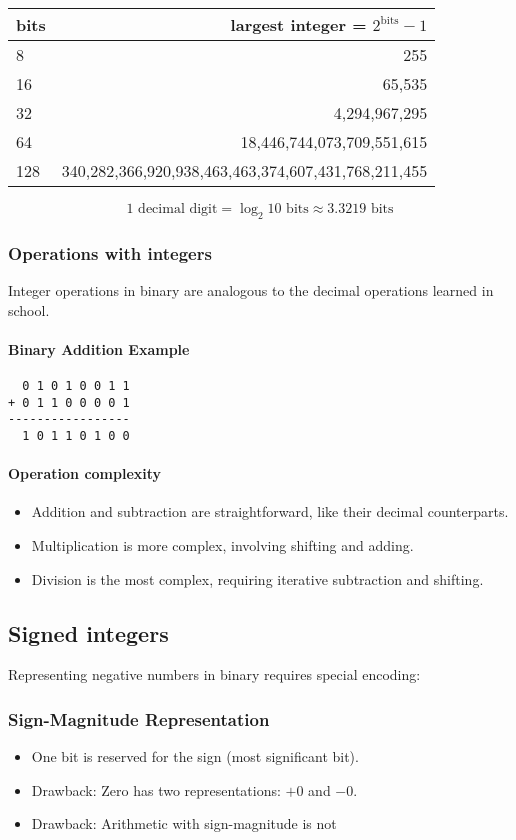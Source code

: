 \documentclass[12pt]{article}
\begin{document}
\begin{tabular}{lr}
\textbf{bits} & \textbf{largest integer = $2^{\text{bits}} - 1$} \\
\hline
8  & 255 \\
16 & 65,535 \\
32 & 4,294,967,295 \\
64 & 18,446,744,073,709,551,615 \\
128 & 340,282,366,920,938,463,463,374,607,431,768,211,455 \\
\end{tabular}



\[
\text{1 decimal digit} = \log_{2}{10} \text{ bits} \approx 3.3219 \text{ bits}
\]


\subsubsection{Operations with integers}
Integer operations in binary are analogous to the decimal operations learned in school.

\paragraph{Binary Addition Example}
\begin{verbatim}
  0 1 0 1 0 0 1 1
+ 0 1 1 0 0 0 0 1
-----------------
  1 0 1 1 0 1 0 0
\end{verbatim}

\paragraph{Operation complexity}
\begin{itemize}
    \item Addition and subtraction are straightforward, like their decimal counterparts.
    \item Multiplication is more complex, involving shifting and adding.
    \item Division is the most complex, requiring iterative subtraction and shifting.
\end{itemize}

\subsection{Signed integers}
Representing negative numbers in binary requires special encoding:
\subsubsection{Sign-Magnitude Representation}
\begin{itemize}
    \item One bit is reserved for the sign (most significant bit).
    \item Drawback: Zero has two representations: $+0$ and $-0$.
    \item Drawback: Arithmetic with sign-magnitude is not
\end{itemize}
\end{document}
